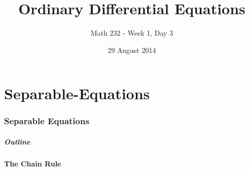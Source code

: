 \part{Separable-Equations}
\section{Separable Equations}


\title{Ordinary Differential Equations}
\subtitle{Math 232 - Week 1, Day 3}
\date{29 August 2014}

\begin{frame}
  \titlepage
\end{frame}

\begin{frame}
  \frametitle{Outline}
  \tableofcontents[ currentsection ]
\end{frame}


\subsection{The Chain Rule}

